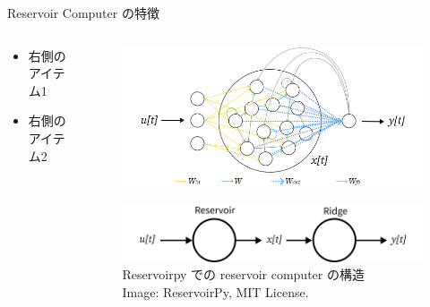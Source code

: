 \begin{frame}{Reservoir Computer の特徴}
    \begin{columns}[T] %
  
      \begin{column}{.5\textwidth}
        
        \begin{itemize}
          \item 右側のアイテム1
          \item 右側のアイテム2
        \end{itemize}
      \end{column}

      \begin{column}{.5\textwidth}
        \begin{figure}
            \includegraphics[width=\textwidth]{Fig/esn.svg.png}
        \end{figure}  
        \begin{figure}
            \includegraphics[width=\textwidth]{Fig/esn_nodes.svg.png}
            \caption{\scriptsize{Reservoirpy での reservoir computer の構造}\\ \tiny{Image: ReservoirPy, MIT License.}}
        \end{figure}  
      \end{column}
    \end{columns}
  \end{frame}


